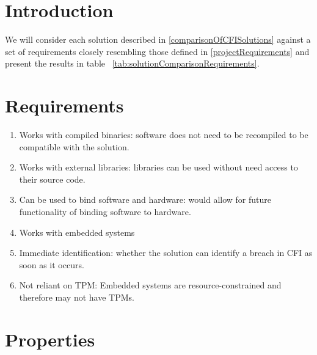 \section{Introduction}\label{requirementsIntro}

We will consider each solution described in \ref{comparisonOfCFISolutions} against a set of requirements closely resembling those defined in \ref{projectRequirements} and present the results in table ~\ref{tab:solutionComparisonRequirements}.

\section{Requirements}\label{Requirements}

\begin{enumerate}
	\item Works with compiled binaries: software does not need to be recompiled to be compatible with the solution.
	\item Works with external libraries: libraries can be used without need access to their source code.
	\item Can be used to bind software and hardware: would allow for future functionality of binding software to hardware.
	\item Works with embedded systems
	\item Immediate identification: whether the solution can identify a breach in CFI as soon as it occurs.
	\item Not reliant on TPM: Embedded systems are resource-constrained and therefore may not have TPMs.
\end{enumerate}

\section{Properties}\label{Properties}


